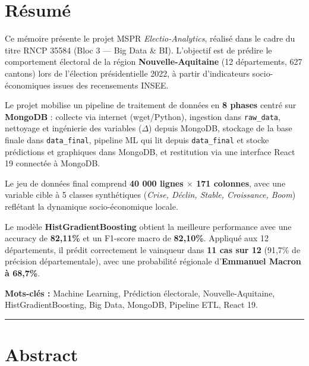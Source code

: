 \chapter*{Résumé}
\thispagestyle{plain}

\begin{infobox}
Ce mémoire présente le projet MSPR \textit{Electio-Analytics}, réalisé dans le cadre du
titre RNCP 35584 (Bloc 3 — Big Data \& BI). L'objectif est de prédire le comportement
électoral de la région \textbf{Nouvelle-Aquitaine} (12 départements, 627 cantons) lors de
l'élection présidentielle 2022, à partir d'indicateurs socio-économiques issues des
recensements INSEE.
\end{infobox}

\vspace{0.5cm}

Le projet mobilise un pipeline de traitement de données en \textbf{8 phases} centré
sur \textbf{MongoDB} : collecte via internet (wget/Python), ingestion dans
\texttt{raw\_data}, nettoyage et ingénierie des variables ($\Delta$) depuis MongoDB,
stockage de la base finale dans \texttt{data\_final}, pipeline ML qui lit depuis
\texttt{data\_final} et stocke prédictions et graphiques dans MongoDB, et restitution
via une interface React 19 connectée à MongoDB.

Le jeu de données final comprend \textbf{40 000 lignes $\times$ 171 colonnes}, avec une
variable cible à 5 classes synthétiques (\textit{Crise, Déclin, Stable, Croissance, Boom})
reflétant la dynamique socio-économique locale.

Le modèle \textbf{HistGradientBoosting} obtient la meilleure performance avec une accuracy
de \textbf{82,11\%} et un F1-score macro de \textbf{82,10\%}. Appliqué aux 12 départements,
il prédit correctement le vainqueur dans \textbf{11 cas sur 12} (91,7\% de précision
départementale), avec une probabilité régionale d'\textbf{Emmanuel Macron à 68,7\%}.

\vspace{0.5cm}
\noindent\textbf{Mots-clés :} Machine Learning, Prédiction électorale, Nouvelle-Aquitaine,
HistGradientBoosting, Big Data, MongoDB, Pipeline ETL, React 19.

\bigskip
\hrule
\bigskip

\chapter*{Abstract}
\thispagestyle{plain}

